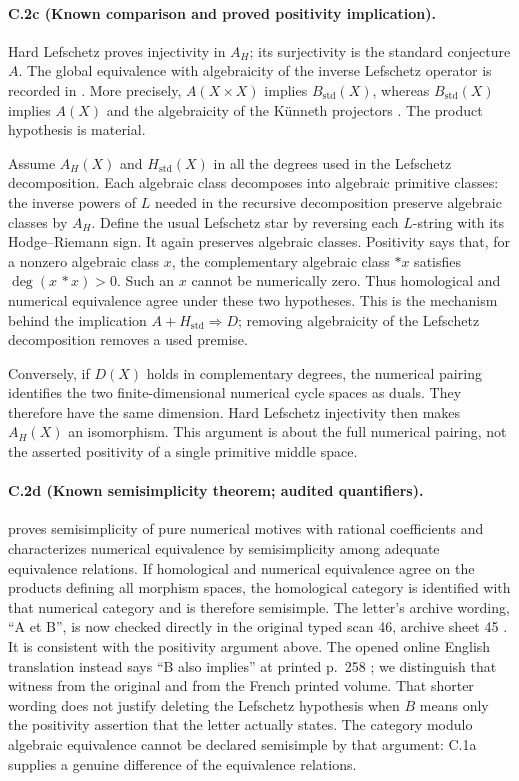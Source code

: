 \paragraph{C.2c (Known comparison and proved positivity implication).}
Hard Lefschetz proves injectivity in $A_H$; its surjectivity is the
standard conjecture $A$. The global equivalence with algebraicity of
the inverse Lefschetz operator is recorded in
\citet[Corollary 2.14]{cyKleiman1968}. More precisely,
$A(X\times X)$ implies $B_{\mathrm{std}}(X)$, whereas
$B_{\mathrm{std}}(X)$ implies $A(X)$ and the algebraicity of the
K\"unneth projectors
\citep[Theorem 4-1]{cyKleiman1994}. The product hypothesis is material.

Assume $A_H(X)$ and $H_{\mathrm{std}}(X)$ in all the degrees used in the
Lefschetz decomposition. Each algebraic class decomposes into algebraic
primitive classes: the inverse powers of $L$ needed in the recursive
decomposition preserve algebraic classes by $A_H$. Define the usual
Lefschetz star by reversing each $L$-string with its Hodge--Riemann sign.
It again preserves algebraic classes. Positivity says that, for a
nonzero algebraic class $x$, the complementary algebraic class $*x$
satisfies $\deg(x\,*x)>0$. Such an $x$ cannot be numerically zero.
Thus homological and numerical equivalence agree under these two
hypotheses. This is the mechanism behind the implication
$A+H_{\mathrm{std}}\Rightarrow D$; removing algebraicity of the
Lefschetz decomposition removes a used premise.

Conversely, if $D(X)$ holds in complementary degrees, the numerical
pairing identifies the two finite-dimensional numerical cycle spaces
as duals. They therefore have the same dimension. Hard Lefschetz
injectivity then makes $A_H(X)$ an isomorphism. This argument is about
the full numerical pairing, not the asserted positivity of a single
primitive middle space.

\paragraph{C.2d (Known semisimplicity theorem; audited quantifiers).}
\citet[Theorem 1]{cyJannsen1992} proves semisimplicity of pure numerical
motives with rational coefficients and characterizes numerical
equivalence by semisimplicity among adequate equivalence relations.
If homological and numerical equivalence agree on the products defining
all morphism spaces, the homological category is identified with that
numerical category and is therefore semisimple. The letter's archive
wording, ``A et B'', is now checked directly in the original typed
scan 46, archive sheet 45
\citep[scan 46]{GrothendieckCote14Scan}. It is consistent with the
positivity argument above. The opened online English translation
instead says ``B also implies'' at printed p.~258
\citep[p.~258]{rootGrothendieckSerreEnglish}; we distinguish that
witness from the original and from the French printed volume.
That shorter wording does not justify deleting the
Lefschetz hypothesis when $B$ means only the positivity assertion that
the letter actually states. The category modulo algebraic equivalence
cannot be declared semisimple by that argument: C.1a supplies a genuine
difference of the equivalence relations.

